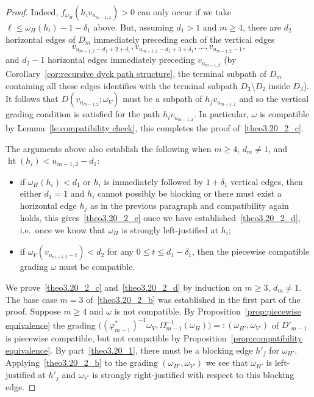 \documentclass[10pt]{amsart}
\theoremstyle{definition}
\newcommand{\ie}{i.e.\ }
\DeclareMathOperator{\hgt}{ht}
\begin{document}
\begin{proof}
 Indeed, $f_{\omega_H}(h_iv_{u_{m-1,2}})>0$ can only occur if we take $\ell\le\omega_H(h_i)-1-\delta_1$ above.
 But, assuming $d_1>1$ and $m\ge4$, there are $d_2$ horizontal edges of $D_m$ immediately preceding each of the vertical edges 
 \[v_{u_{m-1,2}-d_1+2+\delta_1},v_{u_{m-1,2}-d_1+3+\delta_1},\ldots,v_{u_{m-1,2}-1},\]
 and $d_2-1$ horizontal edges immediately preceding $v_{u_{m-1,2}}$ (by Corollary~\ref{cor:recursive dyck path structure}, the terminal subpath of $D_m$ containing all these edges identifies with the terminal subpath $D_3\setminus D_2$ inside $D_3$). 
 It follows that $D(v_{u_{m-1,2}};\omega_V)$ must be a subpath of $h_jv_{u_{m-1,2}}$ and so the vertical grading condition is satisfied for the path $h_iv_{u_{m-1,2}}$. 
 In particular, $\omega$ is compatible by Lemma~\ref{le:compatibility check}, this completes the proof of~\ref{theo3.20_2_c}.

 The arguments above also establish the following when $m\ge4$, $d_m\ne1$, and $\hgt(h_i)<u_{m-1,2}-d_1$:
 \begin{itemize}
 \item if $\omega_H(h_i)<d_1$ or $h_i$ is immediately followed by $1+\delta_1$ vertical edges, then either $d_1=1$ and $h_i$ cannot possibly be blocking or there must exist a horizontal edge $h_j$ as in the previous paragraph and compatibility again holds, this gives~\ref{theo3.20_2_e} once we have established~\ref{theo3.20_2_d}, \ie once we know that $\omega_H$ is strongly left-justified at $h_i$; 
 \item if $\omega_V(v_{u_{m-1,2}-t})<d_2$ for any $0\le t\le d_1-\delta_1$, then the piecewise compatible grading $\omega$ must be compatible.
 \end{itemize}

 We prove~\ref{theo3.20_2_c} and~\ref{theo3.20_2_d} by induction on $m\ge3$, $d_m\ne1$.
 The base case $m=3$ of~\ref{theo3.20_2_b} was established in the first part of the proof.
 Suppose $m\ge4$ and $\omega$ is not compatible. 
 By Proposition~\ref{prop:piecewise equivalence} the grading $\big((\varphi^*_{m-1})^{-1}\omega_V,\Omega_{m-1}^{-1}(\omega_H)\big)=:(\omega_{H'},\omega_{V'})$ of $D'_{m-1}$ is piecewise compatible, but not compatible by Proposition~\ref{prop:compatibility equivalence}. 
 By part~\ref{theo3.20_1}, there must be a blocking edge $h'_j$ for $\omega_{H'}$.
 Applying~\ref{theo3.20_2_b} to the grading $(\omega_{H'},\omega_{V'})$ we see that $\omega_{H'}$ is left-justified at $h'_j$ and $\omega_{V'}$ is strongly right-justified with respect to this blocking edge.


\end{proof}
\end{document}

